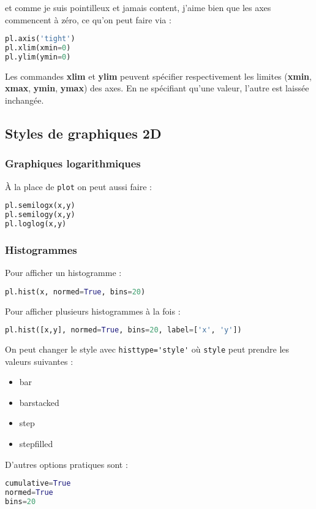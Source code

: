 \documentclass[a4paper,twoside]{article}
\begin{document}
et comme je suis pointilleux et jamais content, j'aime bien que les axes commencent à zéro, ce qu'on peut faire via :
\begin{lstlisting}[language=python]
pl.axis('tight')
pl.xlim(xmin=0)
pl.ylim(ymin=0)
\end{lstlisting}

Les commandes \textbf{xlim} et \textbf{ylim} peuvent spécifier respectivement les limites (\textbf{xmin}, \textbf{xmax}, \textbf{ymin}, \textbf{ymax}) des axes. En ne spécifiant qu'une valeur, l'autre est laissée inchangée.

\subsection{Styles de graphiques 2D}
\subsubsection{Graphiques logarithmiques}

À la place de \verb|plot| on peut aussi faire :
\begin{lstlisting}[language=python]
pl.semilogx(x,y)
pl.semilogy(x,y)
pl.loglog(x,y)
\end{lstlisting}

\subsubsection{Histogrammes}
Pour afficher un histogramme :
\begin{lstlisting}[language=python]
pl.hist(x, normed=True, bins=20)
\end{lstlisting}

Pour afficher plusieurs histogrammes à la fois :
\begin{lstlisting}[language=python]
pl.hist([x,y], normed=True, bins=20, label=['x', 'y'])
\end{lstlisting}

\bigskip

On peut changer le style avec \verb|histtype='style'| où \verb|style| peut prendre les valeurs suivantes :
\begin{itemize}
\item bar
\item barstacked
\item step
\item stepfilled
\end{itemize}

D'autres options pratiques sont :
\begin{lstlisting}[language=python]
cumulative=True
normed=True
bins=20
\end{lstlisting}
\end{document}
